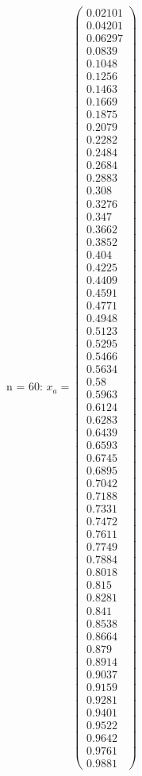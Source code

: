 \documentclass{udpreport}
\begin{document}
\begin{enumerate}
\begin {enumerate}
\begin{enumerate}
\begin{itemize}
\begin{itemize}
				n = 60: $x_{a} = \left(\begin{array}{c} 0.02101\\ 0.04201\\ 0.06297\\ 0.0839\\ 0.1048\\ 0.1256\\ 0.1463\\ 0.1669\\ 0.1875\\ 0.2079\\ 0.2282\\ 0.2484\\ 0.2684\\ 0.2883\\ 0.308\\ 0.3276\\ 0.347\\ 0.3662\\ 0.3852\\ 0.404\\ 0.4225\\ 0.4409\\ 0.4591\\ 0.4771\\ 0.4948\\ 0.5123\\ 0.5295\\ 0.5466\\ 0.5634\\ 0.58\\ 0.5963\\ 0.6124\\ 0.6283\\ 0.6439\\ 0.6593\\ 0.6745\\ 0.6895\\ 0.7042\\ 0.7188\\ 0.7331\\ 0.7472\\ 0.7611\\ 0.7749\\ 0.7884\\ 0.8018\\ 0.815\\ 0.8281\\ 0.841\\ 0.8538\\ 0.8664\\ 0.879\\ 0.8914\\ 0.9037\\ 0.9159\\ 0.9281\\ 0.9401\\ 0.9522\\ 0.9642\\ 0.9761\\ 0.9881 \end{array}\right)$
				

\end{itemize}
\end{itemize}
\end{enumerate}
\end{enumerate}
\end{enumerate}
\end{document}
